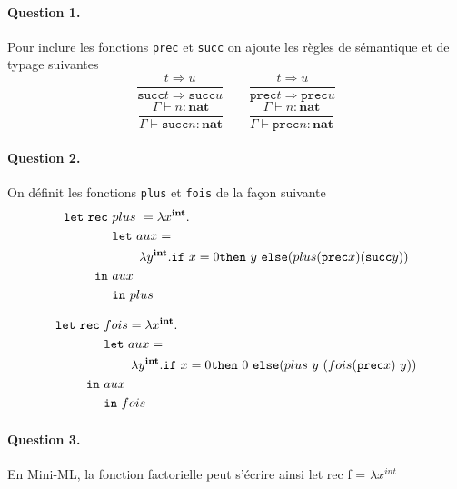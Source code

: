\documentclass{article}
\title{\titre}
\date{}
\author{\auteur}
\newcommand{\titreCourt}{DM -- Mini-ML}
\newcommand{\auteur}{Marius \textsc{Dufraisse}}
\newcommand{\sem}{\Rightarrow}
\theoremstyle{thm}
\theoremstyle{def}
\theoremstyle{dem}
\newcommand{\code}[1]{\texttt{#1}}
\newcommand{\codem}[1]{\mathtt{#1}}
\newcommand{\types}[1]{\mathbf{#1}}
\begin{document}
	\renewcommand{\labelitemi}{\textbullet}



	\maketitle
	\paragraph{Question 1.}
	Pour inclure les fonctions \code{prec} et \code{succ} on ajoute les règles de sémantique et de typage suivantes
	\[ \frac{t \sem u}{\codem{succ}t\sem\codem{succ}{u}}\qquad \frac{t \sem u}{\codem{prec}t\sem\codem{prec}{u}} \]
	\[\frac{\Gamma\vdash  n : \types{nat}}{\Gamma\vdash \codem{succ}n:\types{nat}} \qquad\frac{\Gamma\vdash  n : \types{nat}}{\Gamma\vdash \codem{prec}n:\types{nat}}\]

	\paragraph{Question 2.}
	On définit les fonctions \code{plus} et \code{fois} de la façon suivante
	\begin{align*}
		\codem{let\ rec}\ &plus\ = \lambda x^{\types{int}} .\\
		&\codem{let}\ aux = \\
		&\hspace{0.75cm}\lambda y^{\types{int}}.\codem{if\ }x=0\codem{then}\ y\ \codem{else}(plus(\codem{prec}x)(\codem{succ}y))\\
		\codem{in}\ &aux\\
		&\codem{in\ }plus
	\end{align*}

	\begin{align*}
		\codem{let\ rec}\ &fois=\lambda x^{\types{int}} .\\
		&\codem{let}\ aux = \\
		&\hspace{0.75cm}\lambda y^{\types{int}}.\codem{if\ }x=0\codem{then}\ 0\ \codem{else}(plus\ y\ (fois(\codem{prec}x)\ y))\\
		\codem{in}\ &aux\\
		&\codem{in\ }fois
	\end{align*}

	\paragraph{Question 3.}
	En Mini-ML, la fonction factorielle peut s'écrire ainsi
	let rec f = $\lambda x^{int}$
\end{document}
